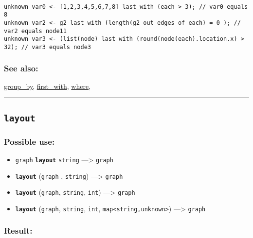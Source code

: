 \documentclass[]{book}
\providecommand{\tightlist}{%
  \setlength{\itemsep}{0pt}\setlength{\parskip}{0pt}}
\theoremstyle{definition}
\theoremstyle{definition}
\theoremstyle{definition}
\theoremstyle{remark}
\begin{document}
\begin{verbatim}
 
unknown var0 <- [1,2,3,4,5,6,7,8] last_with (each > 3); // var0 equals 8 
unknown var2 <- g2 last_with (length(g2 out_edges_of each) = 0 ); // var2 equals node11 
unknown var3 <- (list(node) last_with (round(node(each).location.x) > 32); // var3 equals node3
\end{verbatim}

\subsubsection{See also:}\label{see-also-124}

\href{operators-d-to-h.html\#group_by}{group\_by},
\href{operators-d-to-h.html\#first_with}{first\_with},
\href{operators-s-to-z.html\#where}{where},

\begin{center}\rule{0.5\linewidth}{\linethickness}\end{center}

\subsection{\texorpdfstring{\texttt{layout}}{layout}}\label{layout}

\subsubsection{Possible use:}\label{possible-use-319}

\begin{itemize}
\tightlist
\item
  \texttt{graph} \textbf{\texttt{layout}} \texttt{string}
  ---\textgreater{} \texttt{graph}
\item
  \textbf{\texttt{layout}} (\texttt{graph} , \texttt{string})
  ---\textgreater{} \texttt{graph}
\item
  \textbf{\texttt{layout}} (\texttt{graph}, \texttt{string},
  \texttt{int}) ---\textgreater{} \texttt{graph}
\item
  \textbf{\texttt{layout}} (\texttt{graph}, \texttt{string},
  \texttt{int}, \texttt{map\textless{}string,unknown\textgreater{}})
  ---\textgreater{} \texttt{graph}
\end{itemize}

\subsubsection{Result:}\label{result-309}
\end{document}
